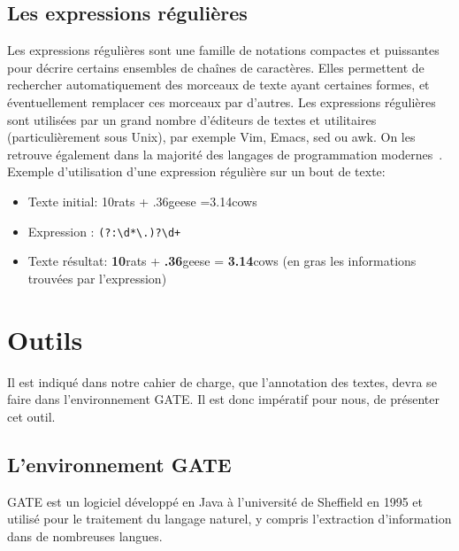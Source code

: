 \documentclass[a4paper, 11pt]{report}
\begin{document}
\subsection{Les expressions régulières}
Les expressions régulières sont une famille de notations compactes et puissantes pour décrire certains ensembles de chaînes de caractères. Elles permettent de rechercher automatiquement des morceaux de texte ayant certaines formes, et éventuellement remplacer ces morceaux par d'autres.
Les expressions régulières sont utilisées par un grand nombre d'éditeurs de textes et utilitaires (particulièrement sous Unix), par exemple Vim, Emacs, sed ou awk. On les retrouve également dans la majorité des langages de programmation modernes~\cite{w3reg}.\\
Exemple d'utilisation d'une expression régulière sur un bout de texte:
\begin{itemize}
\item Texte initial: 10rats + .36geese =3.14cows
\item Expression : \verb|(?:\d*\.)?\d+|
\item Texte résultat: \textbf{10}rats + \textbf{.36}geese = \textbf{3.14}cows (en gras les informations trouvées par l’expression)
\end{itemize}
\section{Outils}%
Il est indiqué dans notre cahier de charge, que l'annotation des textes, devra se faire dans l'environnement GATE. Il est donc impératif pour nous, de présenter cet outil.
\subsection{L'environnement GATE}
GATE est un logiciel développé en Java à l’université de Sheffield en 1995 et utilisé pour
le traitement du langage naturel, y compris l’extraction d’information dans de nombreuses
langues. 
\end{document}

